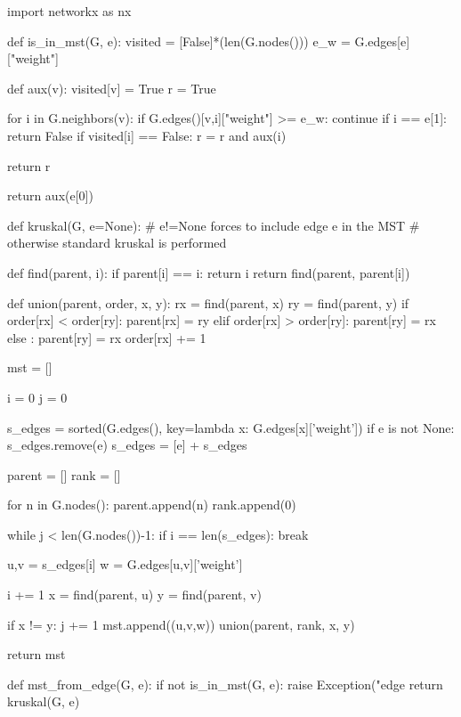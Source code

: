 \documentclass[paper=a4, fontsize=11pt]{scrartcl} %
\numberwithin{equation}{section} %
\numberwithin{figure}{section} %
\numberwithin{table}{section} %
\begin{document}
\begin{pycode}
import networkx as nx

def is_in_mst(G, e):
    visited = [False]*(len(G.nodes())) 
    e_w = G.edges[e]["weight"]
    
    def aux(v):
        visited[v] = True
        r = True
        
        for i in G.neighbors(v):
            if G.edges()[v,i]["weight"] >= e_w:
                continue
            if i == e[1]:
                return False
            if visited[i] == False: 
                r = r and aux(i)
        
        return r
    
    return aux(e[0])


def kruskal(G, e=None): 
    # e!=None forces to include edge e in the MST
    # otherwise standard kruskal is performed
    
    def find(parent, i):
        if parent[i] == i:
            return i
        return find(parent, parent[i])

    def union(parent, order, x, y):
        rx = find(parent, x)
        ry = find(parent, y)
        if order[rx] < order[ry]:
            parent[rx] = ry
        elif order[rx] > order[ry]:
            parent[ry] = rx
        else :
            parent[ry] = rx
            order[rx] += 1

    mst = []
    
    i = 0
    j = 0
    
    s_edges = sorted(G.edges(), key=lambda x: G.edges[x]['weight'])
    if e is not None:
        s_edges.remove(e)
        s_edges = [e] + s_edges
        
    parent = []
    rank = [] 

    for n in G.nodes(): 
        parent.append(n)
        rank.append(0)
  
    while j < len(G.nodes())-1: 
        if i == len(s_edges): break
        
        u,v = s_edges[i]
        w = G.edges[u,v]['weight']
        
        i += 1
        x = find(parent, u)
        y = find(parent, v)

        if x != y: 
            j += 1 
            mst.append((u,v,w))
            union(parent, rank, x, y)
    
    return mst
    
def mst_from_edge(G, e):
    if not is_in_mst(G, e):
        raise Exception("edge %
    return kruskal(G, e)
    
\end{pycode}


\newpage
 

\end{document}
